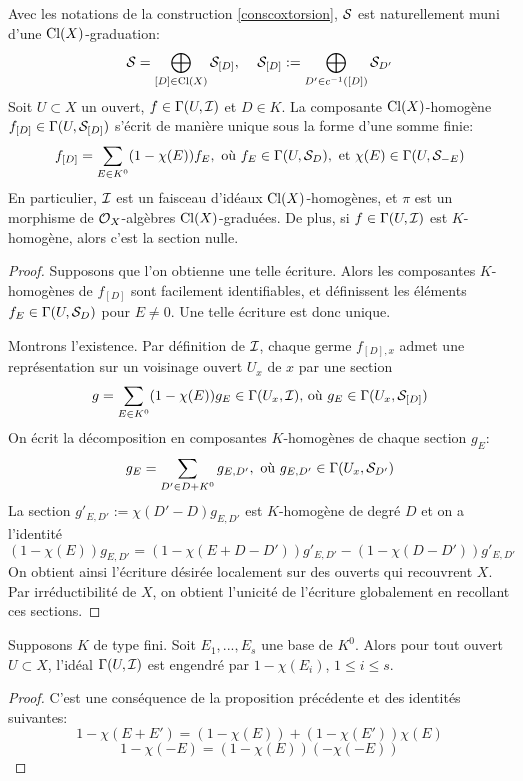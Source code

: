 \begin{prop}\label{coxidealform}
Avec les notations de la construction \ref{conscoxtorsion}, $\mathcal{S}$ est naturellement muni d'une $\operatorname{Cl}(X)$-graduation:
$$\mathcal{S}=\bigoplus_{[D]\in\operatorname{Cl}(X)}\mathcal{S}_{[D]},\,\,\,\,\,\,\, \mathcal{S}_{[D]}:=\bigoplus_{D'\in c^{-1}([D])}\mathcal{S}_{D'}$$
Soit $U\subset X$ un ouvert, $f\in\Gamma(U,\mathcal{I})$ et $D\in K$. La composante $\operatorname{Cl}(X)$-homogène $f_{[D]}\in \Gamma(U,\mathcal{S}_{[D]})$ s'écrit de manière unique sous la forme d'une somme finie:
$$f_{[D]}=\sum_{E\in K^0}(1-\chi(E))f_E, \text{  où } f_E\in\Gamma(U,\mathcal{S}_D), \text{ et }\chi(E)\in \Gamma(U, \mathcal{S}_{-E})$$
En particulier, $\mathcal{I}$ est un faisceau d'idéaux $\operatorname{Cl}(X)$-homogènes, et $\pi$ est un morphisme de $\mathcal{O}_X$-algèbres $\operatorname{Cl}(X)$-graduées. De plus, si $f\in \Gamma(U,\mathcal{I})$ est $K$-homogène, alors c'est la section nulle.
\end{prop}
\begin{proof}
Supposons que l'on obtienne une telle écriture. Alors les composantes $K$-homogènes de $f_{[D]}$ sont facilement identifiables, et définissent les éléments $f_E\in\Gamma(U,\mathcal{S}_D)$ pour $E\neq 0$. Une telle écriture est donc unique.

Montrons l'existence. Par définition de $\mathcal{I}$, chaque germe $f_{[D],x}$ admet une représentation sur un voisinage ouvert $U_x$ de $x$ par une section 
$$g=\sum_{E\in K^0}(1-\chi(E))g_E \in \Gamma(U_x, \mathcal{I})\text{, où }g_E\in \Gamma(U_x, \mathcal{S}_{[D]})$$
On écrit la décomposition en composantes $K$-homogènes de chaque section $g_E$:
$$g_E=\sum_{D'\in D+K^0}g_{E,D'}, \text{ où } g_{E,D'}\in\Gamma(U_x, \mathcal{S}_{D'})$$
La section $g'_{E,D'}:=\chi(D'-D)g_{E,D'}$ est $K$-homogène de degré $D$ et on a l'identité 
$$(1-\chi(E))g_{E,D'}=(1-\chi(E+D-D'))g'_{E,D'}-(1-\chi(D-D'))g'_{E,D'}$$
On obtient ainsi l'écriture désirée localement sur des ouverts qui recouvrent $X$. Par irréductibilité de $X$, on obtient l'unicité de l'écriture globalement en recollant ces sections.
\end{proof}

\begin{cor}\label{genreatorsCoxIdeal}
Supposons $K$ de type fini. Soit $E_1,...,E_s$ une base de $K^0$. Alors pour tout ouvert $U\subset X$, l'idéal $\Gamma(U,\mathcal{I})$ est engendré par $1-\chi(E_i)$, $1\leq i\leq s$.
\end{cor}
\begin{proof}
C'est une conséquence de la proposition précédente et des identités suivantes:
$$1-\chi(E+E')=(1-\chi(E))+(1-\chi(E'))\chi(E)$$
$$1-\chi(-E)=(1-\chi(E))(-\chi(-E))$$
\end{proof}

